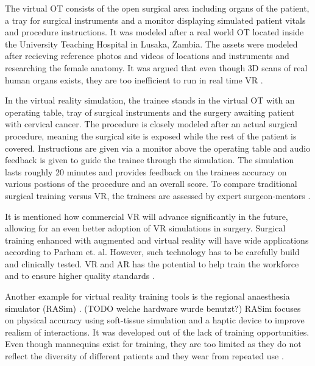 The virtual OT consists of the open surgical area including organs of the patient, a tray for surgical instruments and a monitor displaying simulated patient vitals and procedure instructions.
It was modeled after a real world OT located inside the University Teaching Hospital in Lusaka, Zambia.
The assets were modeled after recieving reference photos and videos of locations and instruments and researching the female anatomy.
It was argued that even though 3D scans of real human organs exists, they are too inefficient to run in real time VR \cite{RN52}.

In the virtual reality simulation, the trainee stands in the virtual OT with an operating table, tray of surgical instruments and the surgery awaiting patient with cervical cancer.
The procedure is closely modeled after an actual surgical procedure, meaning the surgical site is exposed while the rest of the patient is covered.
Instructions are given via a monitor above the operating table and audio feedback is given to guide the trainee through the simulation.
The simulation lasts roughly 20 minutes and provides feedback on the trainees accuracy on various postions of the procedure and an overall score.
To compare traditional surgical training versus VR, the trainees are assessed by expert surgeon-mentors \cite{RN52}.

It is mentioned how commercial VR will advance significantly in the future, allowing for an even better adoption of VR simulations in surgery.
Surgical training enhanced with augmented and virtual reality will have wide applications according to Parham et. al.
However, such technology has to be carefully build and clinically tested.
VR and AR has the potential to help train the workforce and to ensure higher quality standards \cite{RN52}.

Another example for virtual reality training tools is the regional anaesthesia simulator (RASim) \cite{RN70}. (TODO welche hardware wurde benutzt?)
RASim focuses on physical accuracy using soft-tissue simulation and a haptic device to improve realism of interactions.
It was developed out of the lack of training opportunities. Even though mannequins exist for training, they are too limited 
as they do not reflect the diversity of different patients and they wear from repeated use \cite{RN70}.

